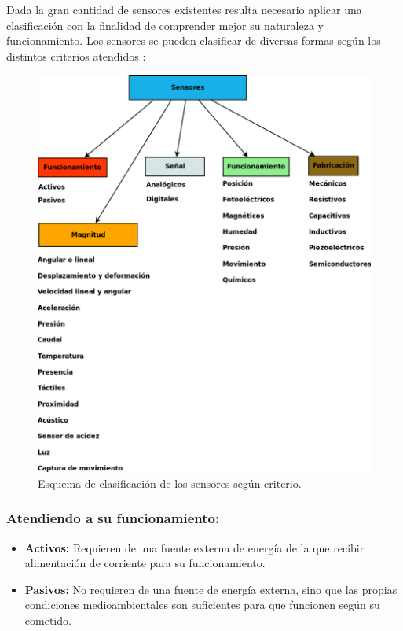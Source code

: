 Dada la gran cantidad de sensores existentes resulta necesario aplicar una clasificación con la finalidad de comprender mejor su naturaleza y funcionamiento. Los sensores se pueden 
clasificar de diversas formas según los distintos criterios atendidos \cite{book:guiapracticasensores}:\\

\begin{figure}[H]
  \begin{center}
    \includegraphics[scale=0.4]{diagramas/sensores_clasificacion.png}
  \end{center}
  \label{fig:clasificacion_sensores}
 \caption{Esquema de clasificación de los sensores según criterio.}
\end{figure}

\subsubsection{Atendiendo a su funcionamiento:}
\begin{itemize}
 \item \textbf{Activos:} Requieren de una fuente externa de energía de la que recibir alimentación de corriente para su funcionamiento.
 \item \textbf{Pasivos:} No requieren de una fuente de energía externa, sino que las propias condiciones medioambientales son suficientes para que funcionen según su cometido.
\end{itemize}

